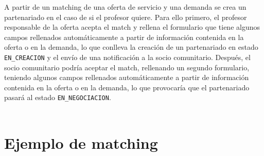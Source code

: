 \documentclass[11pt]{book}
\begin{document}
A partir de un matching de una oferta de servicio y una demanda se crea un partenariado en el caso de si el profesor quiere. Para ello primero, el profesor responsable de la oferta acepta el match y rellena el formulario que tiene  algunos campos rellenados automáticamente a partir de información contenida en la oferta o en la demanda, lo que conlleva la creación de un partenariado en estado \texttt{EN\_CREACION} y el envío de una notificación a la socio comunitario. Después, el socio comunitario podría aceptar el match, rellenando un segundo formulario, teniendo algunos campos rellenados automáticamente a partir de información contenida en la oferta o en la demanda, lo que provocaría que el partenariado pasará al estado \texttt{EN\_NEGOCIACION}.\\\\

\section{Ejemplo de matching}
\end{document}
